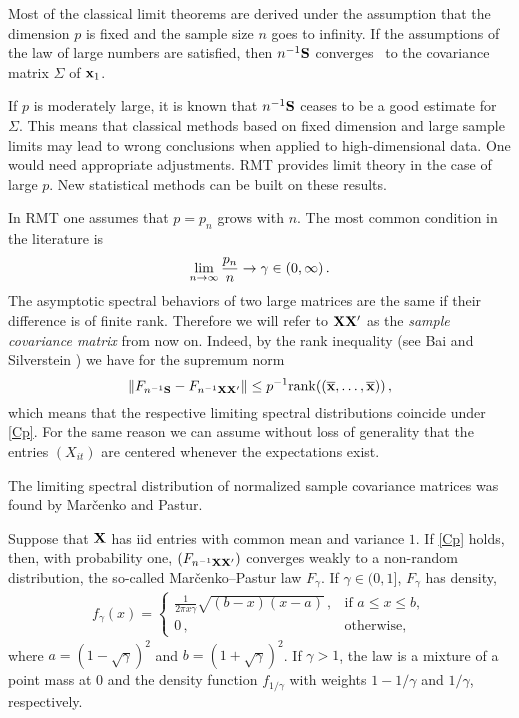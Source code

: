 Most of the classical limit theorems are derived under the assumption that the dimension $p$ is fixed and the sample size $n$ goes to infinity. 
If the assumptions of the law of large numbers are satisfied, then $n^{-1} {\mathbf S}$ converges \as~to the covariance matrix $\Sigma$ of ${\mathbf x}_1$.

If $p$ is moderately large, it is known that $n^{-1} {\mathbf S}$ ceases to be a good estimate for $\Sigma$. This means that classical methods based on fixed dimension and large sample limits may lead to wrong conclusions when applied to high-dimensional data. One would need appropriate adjustments. RMT provides limit theory in the case of large $p$. New statistical methods can be built on these results. 

In RMT one assumes that $p=p_n$ grows with $n$. The most common condition in the literature is
\begin{equation}\label{Cp}
\lim_{\nto} \frac{p_n}{n}\to \gamma\in (0,\infty)\,. %
\end{equation}
The asymptotic spectral behaviors of two large matrices are the same if their difference is of finite rank. Therefore we will refer to ${\mathbf X}{\mathbf X}'$ as the {\em sample covariance matrix} from now on. Indeed, by the rank inequality (see Bai and Silverstein \cite[Theorem A.44]{bai:silverstein:2010}) we have for the supremum norm
\begin{equation*}
\| F_{n^{-1}{\mathbf S}}-F_{n^{-1}{\mathbf X}{\mathbf X}'} \| \le p^{-1} \mathrm{rank}((\overline{{\mathbf x}},\ldots,\overline{{\mathbf x}}))\,,
\end{equation*}
which means that the respective limiting spectral distributions coincide under \eqref{Cp}. For the same reason we can assume without loss of generality that the entries $(X_{it})$ are centered whenever the expectations exist. 
\par 

The limiting spectral distribution of normalized sample covariance matrices was found by Mar\v cenko and Pastur.

\begin{theorem}\label{thm:mpch1}
Suppose that ${\mathbf X}$ has iid entries with common mean and variance $1$. If \eqref{Cp} holds, then, with probability one, $(F_{n^{-1}{\mathbf X} {\mathbf X}'})$ converges weakly to a non-random distribution, the so-called  Mar\v cenko--Pastur law $F_\gamma$. If $\gamma \in (0,1]$,  $F_\gamma$  has density,
\begin{eqnarray}\label{eq:MPch1}
f_\gamma(x) =
\left\{\begin{array}{ll}
\frac{1}{2\pi x\gamma} \sqrt{(b-x)(x-a)} \,, & \mbox{if } a\le x \le b, \\
 0 \,, & \mbox{otherwise,}
\end{array}\right.
\end{eqnarray}\noindent
where $a=(1-\sqrt{\gamma})^2$ and $b=(1+\sqrt{\gamma})^2$. If $\gamma>1$, the \MP law is a mixture of a point mass at $0$ and the density function $f_{1/\gamma}$ with weights $1-1/\gamma$ and $1/\gamma$, respectively.
\end{theorem}

